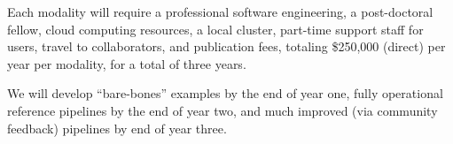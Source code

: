 

Each modality will require a professional software engineering, a post-doctoral fellow, cloud computing resources, a local cluster, part-time support staff for users, travel to collaborators, and publication fees, totaling \$250,000 (direct) per year per modality, for a total of three years.





We will develop ``bare-bones'' examples by the end of year one, fully operational reference pipelines by the end of year two, and much improved (via community feedback) pipelines by end of year three.

